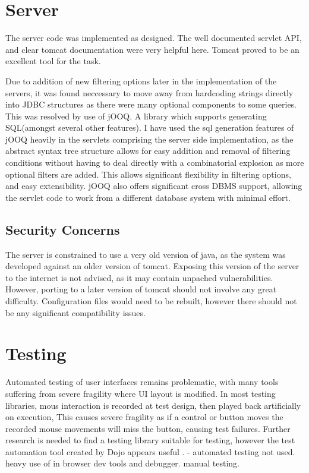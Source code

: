 \section{Server}

The server code was implemented as designed. The well documented servlet API, and clear tomcat documentation were very helpful here. Tomcat proved to be an excellent tool for the task.

Due to addition of new filtering options later in the implementation of the servers, it was found neccessary to move away from hardcoding strings directly into JDBC structures
as there were many optional components to some queries. This was resolved by use of jOOQ. A library which supports generating SQL(amongst several other features). I have used the sql generation features of jOOQ heavily in the servlets comprising the server side implementation, as the abstract syntax tree structure allows for easy addition and removal of filtering conditions without having to deal directly with a combinatorial explosion as more optional filters are added. This allows significant flexibility in filtering options, and easy extensibility. jOOQ also offers significant cross DBMS support, allowing the servlet code to work from a different database system with minimal effort.


\subsection{Security Concerns}
The server is constrained to use a very old version of java, as the system was developed against an older version of tomcat. Exposing this version of the server to the internet is not advised, as it may contain unpached vulnerabilities. However, porting to a later version of tomcat should not involve any great difficulty.  Configuration files would need to be rebuilt, however there should not be any significant compatibility issues.

\section{Testing}
Automated testing of user interfaces remains problematic, with many tools suffering from severe fragility where UI layout is modified. In most testing libraries, mous interaction is recorded at test design, then played back artificially on execution, This causes severe fragility as if a control or button moves the recorded mouse movements will miss the button, causing test failures. Further research is needed to find a testing library suitable for testing, however the test automation tool created by Dojo appears useful \cite{dojo2013test}. - automated testing not used. heavy use of in browser dev tools and debugger. manual testing. 